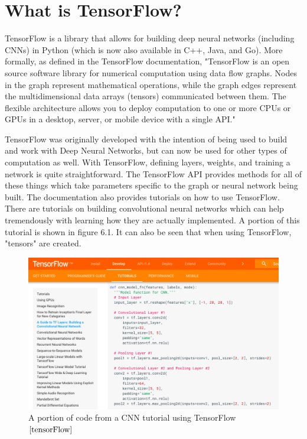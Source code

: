 \documentclass[12pt]{report} %
\begin{document}
\section{What is TensorFlow?}
	TensorFlow is a library that allows for building deep neural networks (including CNNs) in Python (which is now also available in C++, Java, and Go). More formally, as defined in the TensorFlow documentation,  "TensorFlow is an open source software library for numerical computation using data flow graphs. Nodes in the graph represent mathematical operations, while the graph edges represent the multidimensional data arrays (tensors) communicated between them. The flexible architecture allows you to deploy computation to one or more CPUs or GPUs in a desktop, server, or mobile device with a single API."\cite{tensorFlow}
	
	TensorFlow was originally developed with the intention of being used to build and work with Deep Neural Networks, but can now be used for other types of computation as well. With TensorFlow, defining layers, weights, and training a network is quite straightforward. The TensorFlow API provides methods for all of these things which take parameters specific to the graph or neural network being built. The documentation also provides tutorials on how to use TensorFlow. There are tutorials on building convolutional neural networks which can help tremendously with learning how they are actually implemented. A portion of this tutorial is shown in figure 6.1. It can also be seen that when using TensorFlow, "tensors" are created.\cite{tensorFlow}
\begin{figure}
\centering
\includegraphics[width=5in]{tensorflow_cnn}
\caption{A portion of code from a  CNN tutorial using TensorFlow$\cite{tensorFlow}$}
\end{figure}	
\end{document}

